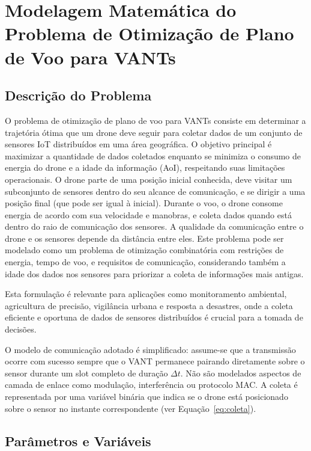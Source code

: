 \documentclass[
    12pt,
    oneside,
    a4paper,
    brazil
]{abntex2}
\begin{document}
    \chapter{Modelagem Matemática do Problema de Otimização de Plano de Voo para VANTs}
    \label{sec:modelagem}

    \section{Descrição do Problema}
    
    O problema de otimização de plano de voo para VANTs consiste em determinar a trajetória ótima que um drone deve seguir para coletar dados de um conjunto de sensores IoT distribuídos em uma área geográfica. O objetivo principal é maximizar a quantidade de dados coletados enquanto se minimiza o consumo de energia do drone e a idade da informação (AoI), respeitando suas limitações operacionais. O drone parte de uma posição inicial conhecida, deve visitar um subconjunto de sensores dentro do seu alcance de comunicação, e se dirigir a uma posição final (que pode ser igual à inicial). Durante o voo, o drone consome energia de acordo com sua velocidade e manobras, e coleta dados quando está dentro do raio de comunicação dos sensores. A qualidade da comunicação entre o drone e os sensores depende da distância entre eles. Este problema pode ser modelado como um problema de otimização combinatória com restrições de energia, tempo de voo, e requisitos de comunicação, considerando também a idade dos dados nos sensores para priorizar a coleta de informações mais antigas.
    
    Esta formulação é relevante para aplicações como monitoramento ambiental, agricultura de precisão, vigilância urbana e resposta a desastres, onde a coleta eficiente e oportuna de dados de sensores distribuídos é crucial para a tomada de decisões.

O modelo de comunicação adotado é simplificado: assume-se que a transmissão ocorre com sucesso sempre que o VANT permanece pairando diretamente sobre o sensor durante um slot completo de duração $\Delta t$. Não são modelados aspectos de camada de enlace como modulação, interferência ou protocolo MAC. A coleta é representada por uma variável binária que indica se o drone está posicionado sobre o sensor no instante correspondente (ver Equação~\eqref{eq:coleta}).


    \section{Parâmetros e Variáveis}
\end{document}
